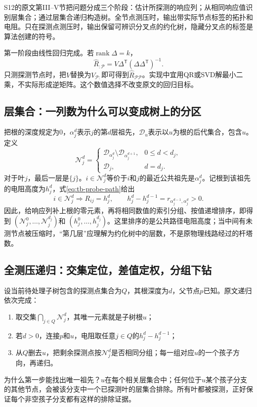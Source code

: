 S12\citep{S12}的原文第III--V节把问题分成三个阶段：估计所探测的响应列；从相同响应值识别层集合；通过层集合递归构造树。全节点测压时，输出带实际节点标签的拓扑和电阻。只在探测点测压时，输出保留可辨识分叉点的约化树，隐藏分叉点的标签是算法创建的符号。

第一阶段由线性回归完成。若$\operatorname{rank}\Delta=k$，
\begin{equation}
 \widehat R_{:\mathcal P}
 =V\Delta^{\mathsf T}(\Delta\Delta^{\mathsf T})^{-1}.
 \label{eq:tb-S12-ls}
\end{equation}
只测探测节点时，把$V$替换为$V_{\mathcal P:}$即可得到$\widehat R_{\mathcal P\mathcal P}$。实现中宜用QR或SVD解最小二乘，不实际形成逆矩阵。这个数值选择不改变原文的回归目标。

\subsection{层集合：一列数为什么可以变成树上的分区}

把根的深度规定为0，$\alpha_j^d$表示$j$的第$d$层祖先，$\mathcal D_u$表示以$u$为根的后代集合，包含$u$。定义
\begin{equation}
 \mathcal N_j^d=
 \begin{cases}
 \mathcal D_{\alpha_j^d}\setminus\mathcal D_{\alpha_j^{d+1}},&0\leq d<d_j,\\
 \mathcal D_j,&d=d_j.
 \end{cases}
 \label{eq:tb-S12-level}
\end{equation}
对于叶$j$，最后一层是$\{j\}$。$i\in\mathcal N_j^d$等价于$i$和$j$的最近公共祖先是$\alpha_j^d$。记根到该祖先的电阻高度为$h_j^d$，式\eqref{eq:tb-probe-path}给出
\[
 i\in\mathcal N_j^d\Longrightarrow R_{ij}=h_j^d,\qquad
 h_j^d-h_j^{d-1}=r_{\alpha_j^{d-1},\alpha_j^d}>0.
\]
因此，给响应列补上根的零元素，再将相同数值的索引分组、按值递增排序，即得到
$(\mathcal N_j^0,\ldots,\mathcal N_j^{d_j})$和
$(h_j^0,\ldots,h_j^{d_j})$。这里排序的是公共路径电阻高度；当中间有未测节点被压缩时，“第几层”应理解为约化树中的层数，不是原物理线路经过的杆塔数。

\subsection{全测压递归：交集定位，差值定权，分组下钻}

设当前待处理子树包含的探测点集合为$Q$，其根深度为$d$，父节点$p$已知。原文递归依次完成：
\begin{enumerate}
 \item 取交集$\bigcap_{j\in Q}\mathcal N_j^d$，其唯一元素就是子树根$u$；
 \item 若$d>0$，连接$p$和$u$，电阻取任意$j\in Q$的$h_j^d-h_j^{d-1}$；
 \item 从$Q$删去$u$，把剩余探测点按$\mathcal N_j^d$是否相同分组；每一组对应$u$的一个孩子方向，再递归。
\end{enumerate}
为什么第一步能找出唯一祖先？$u$在每个相关层集合中；任何位于$u$某个孩子分支的其他节点，会被该分支中一个已探测叶的层集合排除。所有叶都被探测，正好保证每个非空孩子分支都有这样的排除证据。

